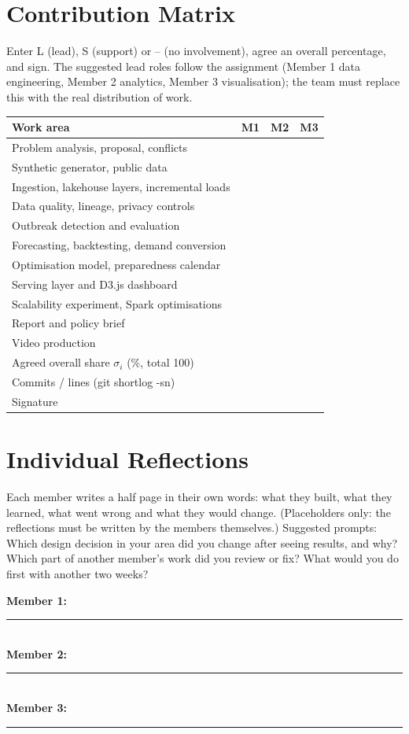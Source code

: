\section{Contribution Matrix}\label{app:matrix}
Enter L (lead), S (support) or -- (no involvement), agree an overall percentage, and sign. The suggested lead roles follow the assignment (Member 1 data engineering, Member 2 analytics, Member 3 visualisation); the team must replace this with the real distribution of work.
\begin{table}[h]\centering\footnotesize
\begin{tabularx}{\columnwidth}{@{}Xccc@{}}\toprule Work area & M1 & M2 & M3 \\\midrule
Problem analysis, proposal, conflicts & & & \\
Synthetic generator, public data & & & \\
Ingestion, lakehouse layers, incremental loads & & & \\
Data quality, lineage, privacy controls & & & \\
Outbreak detection and evaluation & & & \\
Forecasting, backtesting, demand conversion & & & \\
Optimisation model, preparedness calendar & & & \\
Serving layer and D3.js dashboard & & & \\
Scalability experiment, Spark optimisations & & & \\
Report and policy brief & & & \\
Video production & & & \\\midrule
Agreed overall share $\sigma_i$ (\%, total 100) & & & \\
Commits / lines (git shortlog -sn) & & & \\
Signature & & & \\\bottomrule
\end{tabularx}\end{table}

\section{Individual Reflections}\label{app:reflect}
Each member writes a half page in their own words: what they built, what they learned, what went wrong and what they would change. (Placeholders only: the reflections must be written by the members themselves.) Suggested prompts: Which design decision in your area did you change after seeing results, and why? Which part of another member's work did you review or fix? What would you do first with another two weeks?

\vspace{4pt}\noindent\textbf{Member 1:} \rule{0.9\columnwidth}{0.4pt}\\[10pt]
\noindent\textbf{Member 2:} \rule{0.9\columnwidth}{0.4pt}\\[10pt]
\noindent\textbf{Member 3:} \rule{0.9\columnwidth}{0.4pt}
